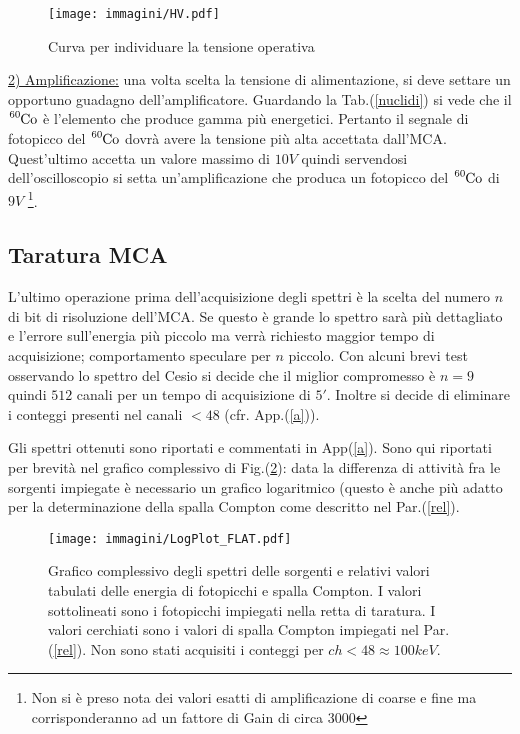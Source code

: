 \documentclass[12pt,a4paper,openright,twoside]{article}
\numberwithin{equation}{section} %
\begin{document}
 \begin{figure}[hbtp]
 \centering
 \texttt{[image: immagini/HV.pdf]}
 \caption{Curva per individuare la tensione operativa}
 \label{counts}
 \end{figure}
 
 \underline{ 2) Amplificazione:} una volta scelta la tensione di alimentazione, si deve settare un opportuno guadagno dell'amplificatore. Guardando la Tab.(\ref{nuclidi}) si vede che il $\ce{^{60}_{}Co}$ è l'elemento che produce gamma più energetici. Pertanto il segnale di fotopicco del $\ce{^{60}_{}Co}$ dovrà avere la tensione più alta accettata dall'MCA. Quest'ultimo accetta un valore massimo di $10V$ quindi servendosi dell'oscilloscopio si setta un'amplificazione che produca un fotopicco del $\ce{^{60}_{}Co}$ di $9V$ \footnote{Non si è preso nota dei valori esatti di amplificazione di coarse e fine ma corrisponderanno ad un fattore di Gain di circa 3000}.

\subsection{Taratura MCA}
L'ultimo operazione prima dell'acquisizione degli spettri è la scelta del numero $n$ di bit di risoluzione dell'MCA. Se questo è grande lo spettro sarà più dettagliato e l'errore sull'energia più piccolo ma verrà richiesto maggior tempo di acquisizione; comportamento speculare per $n$ piccolo. Con alcuni brevi test osservando lo spettro del Cesio si decide che il miglior compromesso è $n=9$ quindi $512$ canali per un tempo di acquisizione di $5'$. Inoltre si decide di eliminare i conteggi presenti nel canali $<48$ (cfr. App.(\ref{a})).

Gli spettri ottenuti sono riportati e commentati in App(\ref{a}).
Sono qui riportati per brevità nel grafico complessivo di Fig.(\ref{tot}): data la differenza di attività fra le sorgenti impiegate è necessario un grafico logaritmico (questo è anche più adatto per la determinazione della spalla Compton come descritto nel Par.(\ref{rel}).

\begin{figure}[hbtp]
\centering
\texttt{[image: immagini/LogPlot\_FLAT.pdf]}
\caption{Grafico complessivo degli spettri delle sorgenti e relativi valori tabulati delle energia di fotopicchi e spalla Compton. I valori sottolineati sono i fotopicchi impiegati nella retta di taratura. I valori cerchiati sono i valori di spalla Compton impiegati nel Par.(\ref{rel}). Non sono stati acquisiti i conteggi per $ch<48 \approx 100 keV$.}
\label{tot}
\end{figure}
\end{document}

